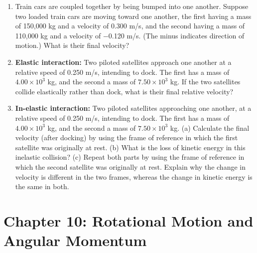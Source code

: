 \documentclass[10pt]{article}
\begin{document}
\begin{enumerate}
\item Train cars are coupled together by being bumped into one another. Suppose two loaded train cars are moving toward one another, the first having a mass of 150,000 kg and a velocity of 0.300 m/s, and the second having a mass of 110,000 kg and a velocity of −0.120 m/s. (The minus indicates direction of motion.) What is their final velocity? \\ \vspace{1.5cm}
\item \textbf{Elastic interaction:} Two piloted satellites approach one another at a relative speed of 0.250 m/s, intending to dock. The first has a mass of $4.00 \times 10^3$ kg, and the second a mass of $7.50 \times 10^3$ kg. If the two satellites collide elastically rather than dock, what is their final relative velocity? \\ \vspace{1.5cm}
\item \textbf{In-elastic interaction:} Two piloted satellites approaching one another, at a relative speed of 0.250 m/s, intending to dock. The first has a mass of $4.00 \times 10^3$ kg, and the second a mass of $7.50 \times 10^3$ kg. (a) Calculate the final velocity (after docking) by using the frame of reference in which the first satellite was originally at rest. (b) What is the loss of kinetic energy in this inelastic collision? (c) Repeat both parts by using the frame of reference in which the second satellite was originally at rest. Explain why the change in velocity is different in the two frames, whereas the change in kinetic energy is the same in both. \\ \vspace{2cm}
\end{enumerate}

\section{Chapter 10: Rotational Motion and Angular Momentum}
\end{document}
